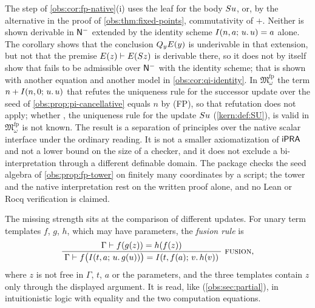 \begin{remark}
\label{obs:rem:fp-scope}
The step of \cref{obs:cor:fp-native}(i) uses the  leaf for the
body $S u$, or, by the alternative in the proof of
\cref{obs:thm:fixed-points}, commutativity of $+$. Neither is shown derivable
in $\mathsf{N}^{-}$ extended by the identity scheme $I(n,a;\,u.\,u)=a$ alone. The
corollary shows that the conclusion $Q_{y}E(y)$ is underivable in that
extension, but not that the premise $E(z)\vdash E(S z)$ is derivable there,
so it does not by itself show that  fails to be admissible over
$\mathsf{N}^{-}$ with the identity scheme; that is shown with another equation and
another model in \cref{obs:cor:qi-identity}. %
In $\mathfrak{M}^{\mathrm{fp}}_\omega$ the term $n+I(n,0;\,u.\,u)$ that
refutes the uniqueness rule for the successor update over the seed of
\cref{obs:prop:pi-cancellative} equals $n$ by (FP), so that refutation does not
apply; whether , the uniqueness rule for the update $S u$
(\cref{kern:def:SU}), is valid in $\mathfrak{M}^{\mathrm{fp}}_\omega$ is not
known. The result is a separation of principles over the native scalar
interface under the ordinary reading. It is not a smaller axiomatization of
$\mathsf{iPRA}$ and not a lower bound on the size of a checker, and it does not exclude
a bi-interpretation through a different definable domain. The package checks
the seed algebra of \cref{obs:prop:fp-tower} on finitely many coordinates by a
script; the tower and the native interpretation rest on the written proof
alone, and no Lean or Rocq verification is claimed.
\end{remark}

The missing strength sits at the comparison of different updates. For unary
term templates $f$, $g$, $h$, which may have parameters, the \emph{fusion rule}
is
\[
\infrule{\Gamma\proves f(g(z))=h(f(z))}
{\Gamma\proves f\bigl(\It{t}{a}{u}{g(u)}\bigr)=\It{t}{f(a)}{v}{h(v)}}
\ \rulename{Fusion},
\]
where $z$ is not free in $\Gamma$, $t$, $a$ or the parameters, and the three
templates contain $z$ only through the displayed argument. It is read, like
 (\cref{obs:sec:partial}), in intuitionistic logic with equality
and the two computation equations.

